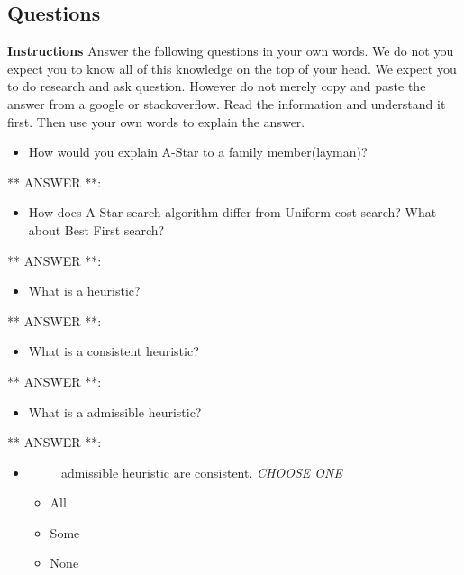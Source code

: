 \documentclass[11pt]{article}
\providecommand{\tightlist}{%
      \setlength{\itemsep}{0pt}\setlength{\parskip}{0pt}}
\begin{document}
    \hypertarget{questions}{%
\subsection{Questions}\label{questions}}

\textbf{Instructions} Answer the following questions in your own words.
We do not you expect you to know all of this knowledge on the top of
your head. We expect you to do research and ask question. However do not
merely copy and paste the answer from a google or stackoverflow. Read
the information and understand it first. Then use your own words to
explain the answer.

    \begin{itemize}
\tightlist
\item
  How would you explain A-Star to a family member(layman)?
\end{itemize}

** ANSWER **:

    \begin{itemize}
\tightlist
\item
  How does A-Star search algorithm differ from Uniform cost search? What
  about Best First search?
\end{itemize}

** ANSWER **:

    \begin{itemize}
\tightlist
\item
  What is a heuristic?
\end{itemize}

** ANSWER **:

    \begin{itemize}
\tightlist
\item
  What is a consistent heuristic?
\end{itemize}

** ANSWER **:

    \begin{itemize}
\tightlist
\item
  What is a admissible heuristic?
\end{itemize}

** ANSWER **:

    \begin{itemize}
\tightlist
\item
  \_\_\_ admissible heuristic are consistent. \emph{CHOOSE ONE}

  \begin{itemize}
  \tightlist
  \item
    All
  \item
    Some
  \item
    None
  \end{itemize}
\end{itemize}
\end{document}
